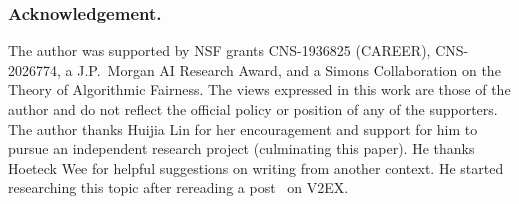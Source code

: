 \subsubsection{Acknowledgement.}
The author was supported by NSF grants CNS-1936825 (CAREER), CNS-2026774, a J.P.~Morgan AI Research Award, and a Simons Collaboration on the Theory of Algorithmic Fairness.
The views expressed in this work are those of the author and do not reflect the official policy or position of any of the supporters.
The author thanks Huijia Lin for her encouragement and support
for him to pursue an independent research project (culminating this paper).
He thanks Hoeteck Wee for helpful suggestions on writing from another context.
He started researching this topic after rereading a post~\cite{V2EX:759538} on V2EX.
